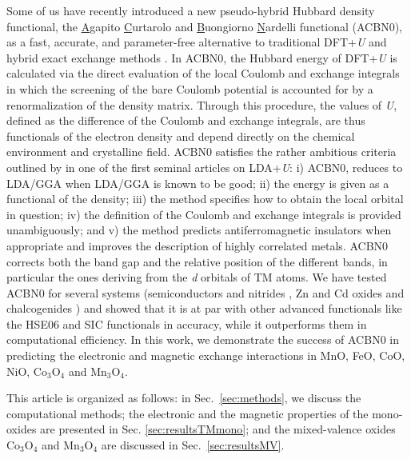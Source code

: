 \documentclass[12pt,a4paper,final]{iopart}
\begin{document}
Some of us have recently introduced a new pseudo-hybrid Hubbard density functional, the \underline{A}gapito \underline{C}urtarolo  and \underline{B}uongiorno \underline{N}ardelli  functional (ACBN0),  as a fast, accurate, and parameter-free alternative to traditional DFT+\textit{U} and hybrid exact exchange methods \cite{agapito2015reformulation}.
In ACBN0, the Hubbard energy of DFT+\textit{U} is calculated via the direct evaluation of the local Coulomb and exchange integrals in which the screening of the bare Coulomb potential is accounted for by a renormalization of the density matrix. Through this procedure, the values of \textit{U}, defined as the difference of the Coulomb and exchange integrals, are thus functionals of the electron density and depend directly on the chemical environment and crystalline field. ACBN0 satisfies the rather ambitious criteria outlined by \cite{pickett1998reformulation} in one of the first seminal articles on LDA+\textit{U}: i) ACBN0, reduces to LDA/GGA when LDA/GGA is known to be good; ii) the energy is given as a functional of the density; iii) the method specifies how to obtain the local orbital in question; iv) the definition of the Coulomb and exchange integrals is provided unambiguously; and v) the method predicts antiferromagnetic insulators when appropriate and improves the description of highly correlated metals. ACBN0 corrects both the band gap and the relative position of the different bands, in particular the ones deriving from the \textit{d} orbitals of TM atoms.
We have tested ACBN0 for several systems (semiconductors and nitrides \cite{supka2017aflow}, Zn and Cd oxides and chalcogenides \cite{gopal2015improved}) and showed that it is at par with other advanced functionals like the HSE06 and SIC functionals in accuracy, while it outperforms them in computational efficiency. In this work, we demonstrate the success of ACBN0 in predicting the electronic and magnetic exchange interactions in MnO, FeO, CoO, NiO, Co$_3$O$_4$ and Mn$_3$O$_4$. 

This article is organized as follows: in Sec.\  \ref{sec:methods}, we discuss the computational methods; the electronic and the magnetic properties of  the  mono-oxides are presented in Sec. \ref{sec:resultsTMmono}; and the mixed-valence oxides Co$_3$O$_4$ and Mn$_3$O$_4$ are discussed in Sec.\  \ref{sec:resultsMV}. 
\end{document}
